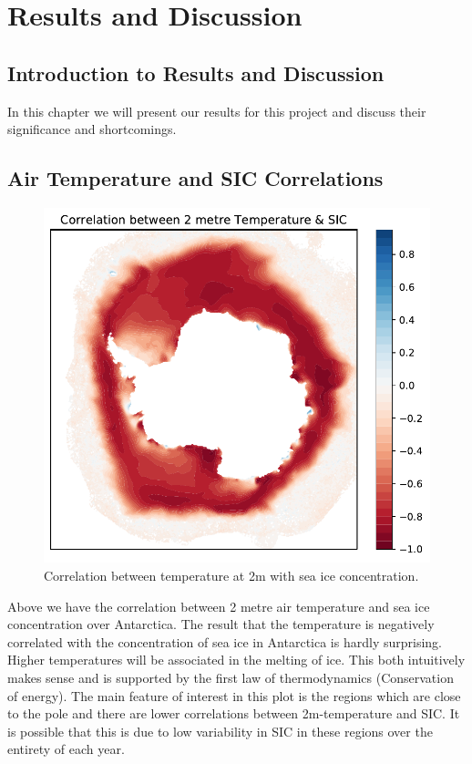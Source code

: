 \chapter{Results and Discussion}
\label{Chap:Results}

\section{Introduction to Results and Discussion}
In this chapter we will present our results for this project and discuss their significance and shortcomings.

\section{Air Temperature and SIC Correlations}
\begin{figure}[H]
    \centering
    \includegraphics{Images/tempcorrwithsic.pdf}
    \caption{Correlation between temperature at 2m with sea ice concentration.}
    \label{fig:results:2mtemp_corr_with_sic}
\end{figure}
Above we have the correlation between 2 metre air temperature and sea ice concentration over Antarctica. The result that the temperature is negatively correlated with the concentration of sea ice in Antarctica is hardly surprising. Higher temperatures will be associated in the melting of ice. This both intuitively makes sense and is supported by the first law of thermodynamics (Conservation of energy). The main feature of interest in this plot is the regions which are close to the pole and there are lower correlations between 2m-temperature and SIC. It is possible that this is due to low variability in SIC in these regions over the entirety of each year.